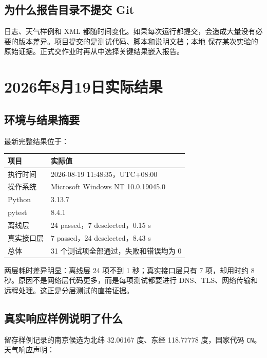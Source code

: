 \documentclass[UTF8,zihao=-4,a4paper]{ctexart}
\newcommand{\code}[1]{\texttt{#1}}
\begin{document}
\subsection{为什么报告目录不提交 Git}

日志、天气样例和 XML 都随时间变化。如果每次运行都提交，会造成大量没有必要的版本差异。项目提交的是测试代码、脚本和说明文档；本地  保存某次实验的原始证据。正式交作业时再从中选择关键结果嵌入报告。

\section{2026年8月19日实际结果}

\subsection{环境与结果摘要}

最新完整结果位于：

\begin{center}
\end{center}

\begin{table}[htbp]
\centering
\begin{tabularx}{0.92\textwidth}{lX}
\toprule
项目 & 实际值 \\
\midrule
执行时间 & 2026-08-19 11:48:35，UTC+08:00 \\
操作系统 & Microsoft Windows NT 10.0.19045.0 \\
Python & 3.13.7 \\
pytest & 8.4.1 \\
离线层 & 24 passed，7 deselected，0.15 s \\
真实接口层 & 7 passed，24 deselected，8.43 s \\
总体 & 31 个测试项全部通过，失败和错误均为 0 \\
\bottomrule
\end{tabularx}
\end{table}

两层耗时差异明显：离线层 24 项不到 1 秒；真实接口层只有 7 项，却用时约 8 秒。原因不是网络层代码更多，而是每项测试都要进行 DNS、TLS、网络传输和远程处理。这正是分层测试的直接证据。

\subsection{真实响应样例说明了什么}

留存样例记录的南京候选为北纬 32.06167 度、东经 118.77778 度，国家代码 \code{CN}。天气响应声明：
\end{document}
